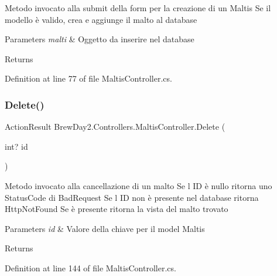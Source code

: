 Metodo invocato alla submit della form per la creazione di un Maltis Se il modello è valido, crea e aggiunge il malto al database 


\begin{DoxyParams}{Parameters}
{\em malti} & Oggetto da inserire nel database\\
\hline
\end{DoxyParams}
\begin{DoxyReturn}{Returns}

\end{DoxyReturn}


Definition at line 77 of file Maltis\+Controller.\+cs.

\mbox{\label{class_brew_day2_1_1_controllers_1_1_maltis_controller_aca90310d889bcd8615707d2fdb81d7e5}} 
\subsubsection{\texorpdfstring{Delete()}{Delete()}}
{\footnotesize\ttfamily Action\+Result Brew\+Day2.\+Controllers.\+Maltis\+Controller.\+Delete (\begin{DoxyParamCaption}\item[{int?}]{id }\end{DoxyParamCaption})}



Metodo invocato alla cancellazione di un malto Se l\textquotesingle{} ID è nullo ritorna uno Status\+Code di Bad\+Request Se l\textquotesingle{} ID non è presente nel database ritorna Http\+Not\+Found Se è presente ritorna la vista del malto trovato 


\begin{DoxyParams}{Parameters}
{\em id} & Valore della chiave per il model Maltis\\
\hline
\end{DoxyParams}
\begin{DoxyReturn}{Returns}

\end{DoxyReturn}


Definition at line 144 of file Maltis\+Controller.\+cs.

\mbox{\label{class_brew_day2_1_1_controllers_1_1_maltis_controller_aef6ed05fcb512703ac93e52be1b89f4c}} 
